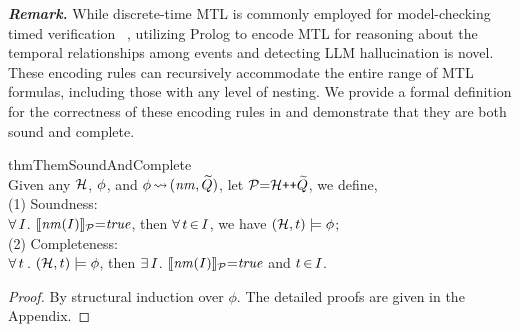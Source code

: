 {\emph{\textbf{Remark.}}} 
While discrete-time MTL is commonly employed for model-checking timed verification~ \cite{DBLP:phd/us/Henzinger91}, utilizing Prolog to encode MTL for reasoning about the temporal relationships among events and detecting LLM hallucination is novel. 
These encoding rules can recursively accommodate the entire range of MTL formulas, including those with any level of nesting. 
We provide a formal definition for the correctness of these encoding rules in  and demonstrate that they are both sound and complete.



\begin{restatable}{thm}{ThemSoundAndComplete}
\label{ThemSoundAndComplete}
~\\
Given any $\mathcal{H}$, 
$\phi$, and 
$\phi{\,\mathrel{\leadsto}\,}(\mathit{nm}, \widetilde{Q})$, let $\mathcal{P}{=}\mathcal{H} \texttt{+}\texttt{+} \widetilde{Q}$, we define,  \\
(1) Soundness: \\
$\forall\, I$.  
$\llbracket \mathit{nm}(I) \rrbracket_{ \mathcal{P}} {=} \mathit{true}$, then 
$\forall\, t\,{\in}\, I$, we have 
$(\mathcal{H}, t) \models \phi$;  \\
(2) Completeness: \\ 
$\forall \,t\,$. $(\mathcal{H}, t) \models \phi$, then $\exists\, I$. $\llbracket \mathit{nm}(I) \rrbracket_{\mathcal{P}} {=} \mathit{true}$  and $t\,{\in}\,I$. 
\end{restatable}

\begin{proof}
By structural induction over $\phi$. 
The detailed proofs are given in the Appendix. %
\end{proof}




